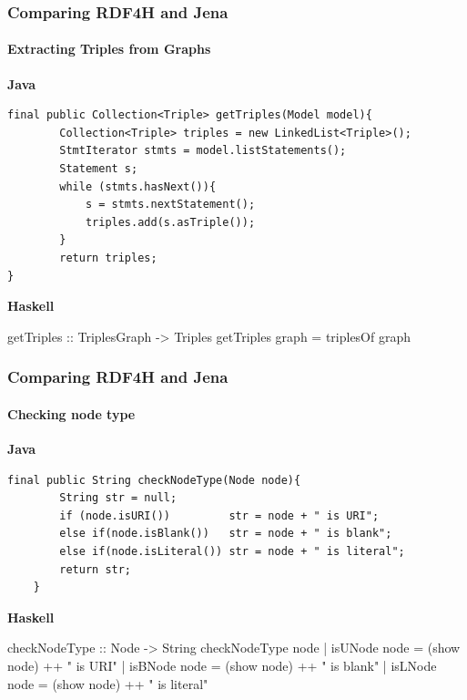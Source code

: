 \documentclass{beamer}
\begin{document}
\begin{frame}[fragile]
\frametitle{Comparing RDF4H and Jena}
\framesubtitle{Extracting Triples from Graphs}

\textbf{Java}

\begin{lstlisting}[style=MyJavaStyle]
final public Collection<Triple> getTriples(Model model){
        Collection<Triple> triples = new LinkedList<Triple>();
        StmtIterator stmts = model.listStatements();
        Statement s;
        while (stmts.hasNext()){
            s = stmts.nextStatement();
            triples.add(s.asTriple());
        }
        return triples;
}
\end{lstlisting}

\bigskip
\textbf{Haskell}

\begin{haskellcode}
getTriples :: TriplesGraph -> Triples
getTriples graph = triplesOf graph
\end{haskellcode}


\end{frame}



\begin{frame}[fragile]
\frametitle{Comparing RDF4H and Jena}
\framesubtitle{Checking node type}

\textbf{Java}

\begin{lstlisting}[style=MyJavaStyle]
final public String checkNodeType(Node node){
        String str = null;
        if (node.isURI())         str = node + " is URI";
        else if(node.isBlank())   str = node + " is blank";
        else if(node.isLiteral()) str = node + " is literal";
        return str;
    }
\end{lstlisting}

\bigskip
\textbf{Haskell}


\begin{haskellcode}
checkNodeType :: Node -> String
checkNodeType node
  | isUNode node = (show node) ++ " is URI"
  | isBNode node = (show node) ++ " is blank"
  | isLNode node = (show node) ++ " is literal"
\end{haskellcode}

\end{frame}
\end{document}
